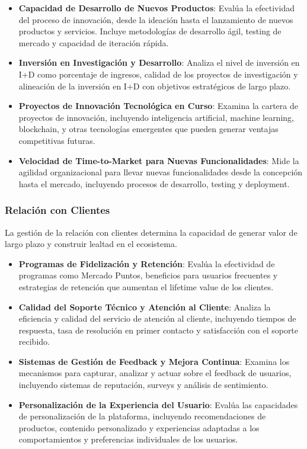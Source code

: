 \begin{itemize}
\item \textbf{Capacidad de Desarrollo de Nuevos Productos}: Evalúa la efectividad del proceso de innovación, desde la ideación hasta el lanzamiento de nuevos productos y servicios. Incluye metodologías de desarrollo ágil, testing de mercado y capacidad de iteración rápida.

\item \textbf{Inversión en Investigación y Desarrollo}: Analiza el nivel de inversión en I+D como porcentaje de ingresos, calidad de los proyectos de investigación y alineación de la inversión en I+D con objetivos estratégicos de largo plazo.

\item \textbf{Proyectos de Innovación Tecnológica en Curso}: Examina la cartera de proyectos de innovación, incluyendo inteligencia artificial, machine learning, blockchain, y otras tecnologías emergentes que pueden generar ventajas competitivas futuras.

\item \textbf{Velocidad de Time-to-Market para Nuevas Funcionalidades}: Mide la agilidad organizacional para llevar nuevas funcionalidades desde la concepción hasta el mercado, incluyendo procesos de desarrollo, testing y deployment.
\end{itemize}

\subsubsection{Relación con Clientes}

La gestión de la relación con clientes determina la capacidad de generar valor de largo plazo y construir lealtad en el ecosistema.

\begin{itemize}
\item \textbf{Programas de Fidelización y Retención}: Evalúa la efectividad de programas como Mercado Puntos, beneficios para usuarios frecuentes y estrategias de retención que aumentan el lifetime value de los clientes.

\item \textbf{Calidad del Soporte Técnico y Atención al Cliente}: Analiza la eficiencia y calidad del servicio de atención al cliente, incluyendo tiempos de respuesta, tasa de resolución en primer contacto y satisfacción con el soporte recibido.

\item \textbf{Sistemas de Gestión de Feedback y Mejora Continua}: Examina los mecanismos para capturar, analizar y actuar sobre el feedback de usuarios, incluyendo sistemas de reputación, surveys y análisis de sentimiento.

\item \textbf{Personalización de la Experiencia del Usuario}: Evalúa las capacidades de personalización de la plataforma, incluyendo recomendaciones de productos, contenido personalizado y experiencias adaptadas a los comportamientos y preferencias individuales de los usuarios.
\end{itemize}

